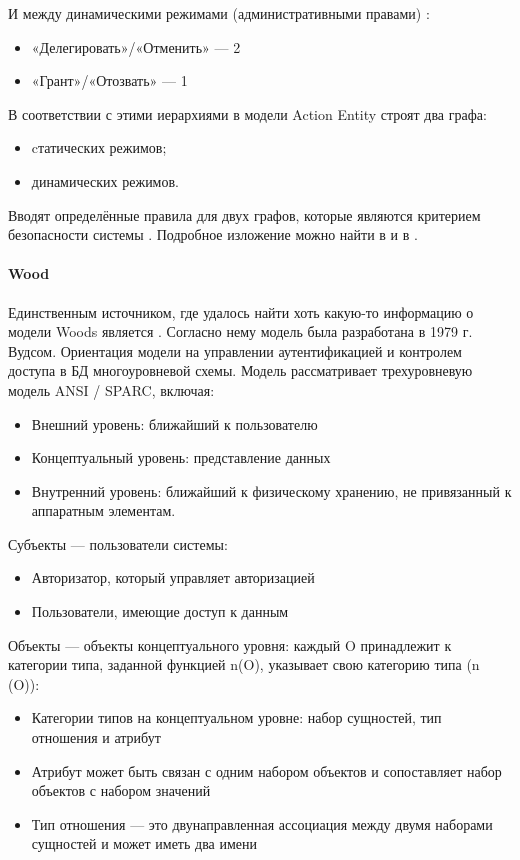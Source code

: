 И между динамическими режимами (административными правами) \autocite{Jalili}:
\begin{itemize}
    \item «Делегировать»/«Отменить» --- 2
    \item «Грант»/«Отозвать» --- 1
\end{itemize}

В соответствии с этими иерархиями в модели Action Entity строят два графа:
\begin{itemize}
    \item cтатических режимов;
    \item динамических режимов.
\end{itemize}

Вводят определённые правила для двух графов, которые являются критерием безопасности системы \autocite{SecModels}.
Подробное изложение можно найти в \autocite{SecModels} и в \autocite{Jalili}.

\paragraph{Wood}

Единственным источником, где удалось найти хоть какую-то информацию о модели Woods является \autocite{Jalili}.
Согласно нему модель была разработана в 1979 г. Вудсом. Ориентация модели на управлении аутентификацией и контролем
доступа в БД многоуровневой схемы. Модель рассматривает трехуровневую модель ANSI / SPARC, включая:
\begin{itemize}
    \item Внешний уровень: ближайший к пользователю
    \item Концептуальный уровень: представление данных
    \item Внутренний уровень: ближайший к физическому хранению, не привязанный к аппаратным элементам.
\end{itemize}

Субъекты --- пользователи системы:
\begin{itemize}
    \item Авторизатор, который управляет авторизацией
    \item Пользователи, имеющие доступ к данным
\end{itemize}

Объекты --- объекты концептуального уровня: каждый O принадлежит к категории типа, заданной функцией n(O),
указывает свою категорию типа (n (O)):
\begin{itemize}
    \item Категории типов на концептуальном уровне: набор сущностей, тип отношения и атрибут
    \item Атрибут может быть связан с одним набором объектов и сопоставляет набор объектов с набором значений
    \item Тип отношения --- это двунаправленная ассоциация между двумя наборами сущностей и может иметь два имени
\end{itemize}

